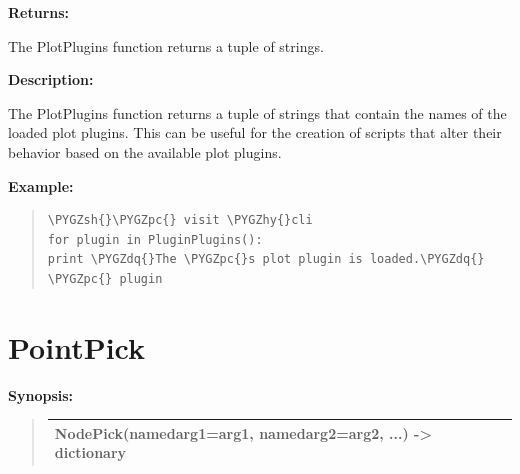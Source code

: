 \documentclass[letterpaper,10pt,english]{sphinxmanual}
\def\PYGZsh{\char`\#}
\def\PYGZpc{\char`\%}
\def\PYGZhy{\char`\-}
\def\PYGZdq{\char`\"}
\begin{document}
\begin{DUlineblock}{0em}
\item[] 
\item[] \textbf{Returns:}
\item[] The PlotPlugins function returns a tuple of strings.
\item[] 
\item[] \textbf{Description:}
\item[] The PlotPlugins function returns a tuple of strings that contain the names
of the loaded plot plugins. This can be useful for the creation of scripts
that alter their behavior based on the available plot plugins.
\end{DUlineblock}

\begin{DUlineblock}{0em}
\item[] 
\end{DUlineblock}

\begin{DUlineblock}{0em}
\item[] \textbf{Example:}
\item[] 
\end{DUlineblock}
\begin{quote}

\begin{Verbatim}[commandchars=\\\{\}]
\PYGZsh{}\PYGZpc{} visit \PYGZhy{}cli
for plugin in PluginPlugins():
print \PYGZdq{}The \PYGZpc{}s plot plugin is loaded.\PYGZdq{} \PYGZpc{} plugin
\end{Verbatim}
\end{quote}


\section{PointPick}
\label{functions:pointpick}
\begin{DUlineblock}{0em}
\item[] \textbf{Synopsis:}
\end{DUlineblock}
\begin{quote}

\begin{tabulary}{\linewidth}{|L|}
\hline

NodePick(namedarg1=arg1, namedarg2=arg2, ...) -\textgreater{} dictionary
\\
\hline\end{tabulary}

\end{quote}
\end{document}
